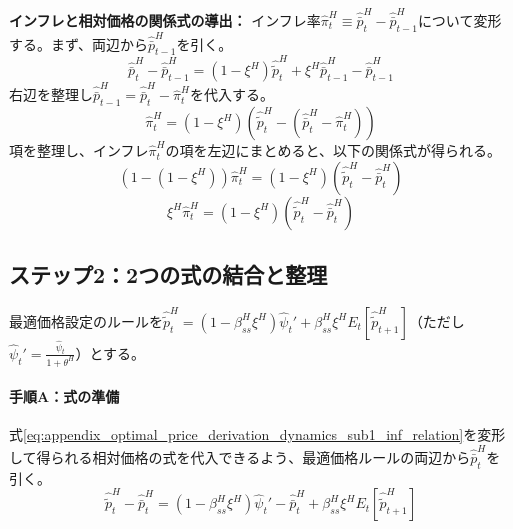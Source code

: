 \textbf{インフレと相対価格の関係式の導出：}
インフレ率\(\hat{\pi}_t^H\equiv\hat{\bar{p}}_t^H-\hat{\bar{p}}_{t-1}^H\)について変形する。まず、両辺から\(\hat{\bar{p}}_{t-1}^H\)を引く。
\begin{equation}
\hat{\bar{p}}_t^H-\hat{\bar{p}}_{t-1}^H=(1-\xi^H)\hat{\widetilde{p}}_t^H+\xi^H\hat{\bar{p}}_{t-1}^H-\hat{\bar{p}}_{t-1}^H
\label{eq:appendix_optimal_price_derivation_dynamics_sub1_inf_step1}
\end{equation}
右辺を整理し\(\hat{\bar{p}}_{t-1}^H=\hat{\bar{p}}_t^H-\hat{\pi}_t^H\)を代入する。
\begin{equation}
\hat{\pi}_t^H=(1-\xi^H)(\hat{\widetilde{p}}_t^H-(\hat{\bar{p}}_t^H-\hat{\pi}_t^H))
\label{eq:appendix_optimal_price_derivation_dynamics_sub1_inf_step2}
\end{equation}
項を整理し、インフレ\(\hat{\pi}_t^H\)の項を左辺にまとめると、以下の関係式が得られる。
\begin{equation}
(1-(1-\xi^H))\hat{\pi}_t^H=(1-\xi^H)(\hat{\widetilde{p}}_t^H-\hat{\bar{p}}_t^H)
\label{eq:appendix_optimal_price_derivation_dynamics_sub1_inf_step3}
\end{equation}
\begin{equation}
\xi^H\hat{\pi}_t^H=(1-\xi^H)(\hat{\widetilde{p}}_t^H-\hat{\bar{p}}_t^H)
\label{eq:appendix_optimal_price_derivation_dynamics_sub1_inf_relation}
\end{equation}

\subsection*{ステップ2：2つの式の結合と整理}
\label{sec:appendix_optimal_price_derivation_dynamics_sub2}
最適価格設定のルールを\(\hat{\widetilde{p}}_t^H=(1-\beta_{ss}^H\xi^H)\hat{\psi}_t'+\beta_{ss}^H\xi^HE_t[\hat{\widetilde{p}}_{t+1}^H]\)（ただし\(\hat{\psi}_t'=\frac{\hat{\psi}_t}{1+\theta^H}\)）とする。

\paragraph{手順A：式の準備}
\label{sec:appendix_optimal_price_derivation_dynamics_sub2_a}
式\eqref{eq:appendix_optimal_price_derivation_dynamics_sub1_inf_relation}を変形して得られる相対価格の式を代入できるよう、最適価格ルールの両辺から\(\hat{\bar{p}}_t^H\)を引く。
\begin{equation}
\hat{\widetilde{p}}_t^H-\hat{\bar{p}}_t^H=(1-\beta_{ss}^H\xi^H)\hat{\psi}_t'-\hat{\bar{p}}_t^H+\beta_{ss}^H\xi^HE_t[\hat{\widetilde{p}}_{t+1}^H]
\label{eq:appendix_optimal_price_derivation_dynamics_sub2_step_a}
\end{equation}

